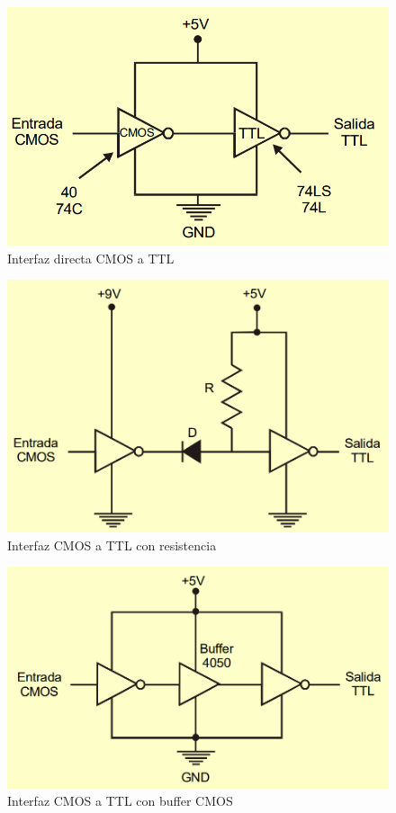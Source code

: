 \documentclass[journal]{IEEEtran}
\begin{document}
	\begin{figure}[!htb]
		\centering
		\includegraphics[scale = 0.25]{img/CMOSTTL.png}
		\caption{Interfaz directa CMOS a TTL \cite{Ladelex}}
		\label{fig:CMOSTTL}
	\end{figure}
	
	\begin{figure}[htb]
		\centering
		\includegraphics[scale = 0.25]{img/CMOSTTLRes.png}
		\caption{Interfaz CMOS a TTL con resistencia \cite{Ladelex}}
		\label{fig:CMOSTTLRes}
	\end{figure}
	
	\begin{figure}[!htb]
		\centering
		\includegraphics[scale = 0.25]{img/CMOSTTLBuff.png}
		\caption{Interfaz CMOS a TTL con buffer CMOS \cite{Ladelex}}
		\label{fig:CMOSTTLBuff}
	\end{figure}
	
\end{document}
